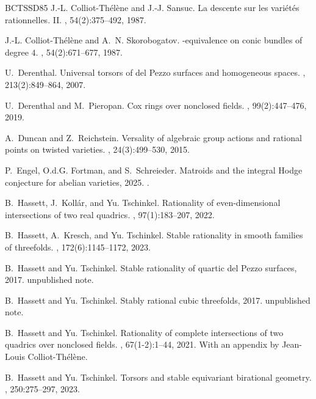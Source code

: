 \documentclass[12pt, reqno]{amsart}
\theoremstyle{plain}
\theoremstyle{remark}
\theoremstyle{definition}
\numberwithin{equation}{section}
\begin{document}
\begin{thebibliography}{BCTSSD85}
J.-L. Colliot-Th\'{e}l\`ene and J.-J. Sansuc.
\newblock La descente sur les vari\'{e}t\'{e}s rationnelles. {II}.
, 54(2):375--492, 1987.

J.-L. Colliot-Th\'el\`ene and A.~N. Skorobogatov.
-equivalence on conic bundles of degree {$4$}.
, 54(2):671--677, 1987.

U.~Derenthal.
\newblock Universal torsors of del {P}ezzo surfaces and homogeneous spaces.
, 213(2):849--864, 2007.

U.~Derenthal and M.~Pieropan.
\newblock Cox rings over nonclosed fields.
, 99(2):447--476, 2019.

A.~Duncan and Z.~Reichstein.
\newblock Versality of algebraic group actions and rational points on twisted
  varieties.
, 24(3):499--530, 2015.

P.~Engel, O.d.G. Fortman, and S.~Schreieder.
\newblock Matroids and the integral {H}odge conjecture for abelian varieties,
  2025.
.

B.~Hassett, J.~Koll\'ar, and Yu. Tschinkel.
\newblock Rationality of even-dimensional intersections of two real quadrics.
, 97(1):183--207, 2022.

B.~Hassett, A.~Kresch, and Yu. Tschinkel.
\newblock Stable rationality in smooth families of threefolds.
, 172(6):1145--1172, 2023.

B.~Hassett and Yu. Tschinkel.
\newblock Stable rationality of quartic del {P}ezzo surfaces, 2017.
\newblock unpublished note.

B.~Hassett and Yu. Tschinkel.
\newblock Stably rational cubic threefolds, 2017.
\newblock unpublished note.

B.~Hassett and Yu. Tschinkel.
\newblock Rationality of complete intersections of two quadrics over nonclosed
  fields.
, 67(1-2):1--44, 2021.
\newblock With an appendix by Jean-Louis Colliot-Th\'{e}l\`ene.

B.~Hassett and Yu. Tschinkel.
\newblock Torsors and stable equivariant birational geometry.
, 250:275--297, 2023.


\end{thebibliography}
\end{document}
